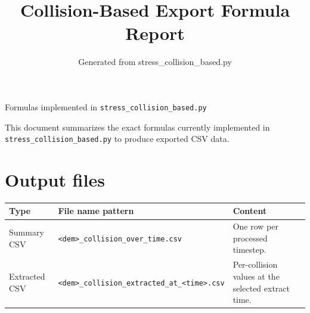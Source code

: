 \documentclass[11pt,a4paper]{article}
\title{Collision-Based Export Formula Report}
\author{Generated from stress\_collision\_based.py}
\date{}
\newcommand{\code}[1]{\begingroup\urlstyle{tt}\footnotesize\nolinkurl{#1}\endgroup}
\begin{document}
\maketitle
\noindent Formulas implemented in \code{stress_collision_based.py}\par
\medskip
\noindent This document summarizes the exact formulas currently implemented in \code{stress_collision_based.py} to produce exported CSV data.

\section*{Output files}
\begin{longtable}{@{}L{0.18\textwidth}L{0.32\textwidth}L{0.42\textwidth}@{}}
\toprule
\textbf{Type} & \textbf{File name pattern} & \textbf{Content}\\
\midrule
\endhead
Summary CSV & \code{<dem>_collision_over_time.csv} & One row per processed timestep.\\
Extracted CSV & \code{<dem>_collision_extracted_at_<time>.csv} & Per-collision values at the selected extract time.\\
\bottomrule
\end{longtable}
\end{document}
